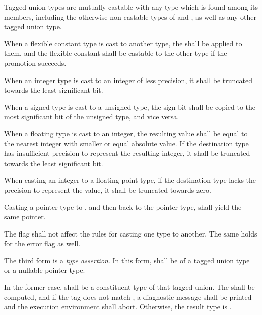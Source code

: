 \specsubsubitem
Tagged union types are mutually castable with any type which is found among its
members, including the otherwise non-castable types of  and
, as well as any other tagged union type.

\specsubsubitem
When a flexible constant type is cast to another type, the
 shall be applied to them, and
the flexible constant shall be castable to the other type if the promotion
succeeds.

\specsubsubitem
When an integer type is cast to an integer of less precision, it shall be
truncated towards the least significant bit.

\specsubsubitem
When a signed type is cast to a unsigned type, the sign bit shall be copied to
the most significant bit of the unsigned type, and vice versa.

\specsubsubitem
When a floating type is cast to an integer, the resulting value shall be equal
to the nearest integer with smaller or equal absolute value. If the destination
type has insufficient precision to represent the resulting integer, it shall be
truncated towards the least significant bit.

\specsubsubitem
When casting an integer to a floating point type, if the destination type
lacks the precision to represent the value, it shall be truncated towards zero.

\specsubsubitem
Casting a pointer type to , and then back to the pointer
type, shall yield the same pointer.


\specsubsubitem
The  flag shall not affect the rules for casting one type to
another. The same holds for the error flag as well.

\specsubsubitem
The third form is a \textit{type assertion}. In this form,
 shall be of a tagged union type or a nullable
pointer type.

In the former case,  shall be a constituent
type of that tagged union. The  shall be computed,
and if the tag does not match , a diagnostic message shall be
printed and the execution environment shall abort. Otherwise, the result type
is .

